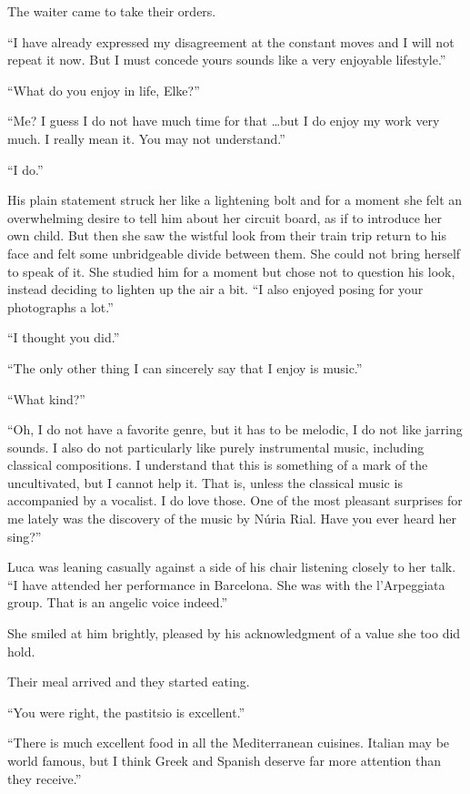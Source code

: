 The waiter came to take their orders.

``I have already expressed my disagreement at the constant moves and I will not repeat it now. But I must concede yours sounds like a very enjoyable lifestyle.''

``What do you enjoy in life, Elke?''

``Me? I guess I do not have much time for that \ldots but I do enjoy my work very much. I really mean it. You may not understand.''

``I do.''

His plain statement struck her like a lightening bolt and for a moment she felt an overwhelming desire to tell him about her circuit board, as if to introduce her own child. But then she saw the wistful look from their train trip return to his face and felt some unbridgeable divide between them. She could not bring herself to speak of it. She studied him for a moment but chose not to question his look, instead deciding to lighten up the air a bit. ``I also enjoyed posing for your photographs a lot.''

``I thought you did.''

``The only other thing I can sincerely say that I enjoy is music.''

``What kind?''

``Oh, I do not have a favorite genre, but it has to be melodic, I do not like jarring sounds. I also do not particularly like purely instrumental music, including classical compositions. I understand that this is something of a mark of the uncultivated, but I cannot help it. That is, unless the classical music is accompanied by a vocalist. I do love those. One of the most pleasant surprises for me lately was the discovery of the music by Núria Rial. Have you ever heard her sing?''

Luca was leaning casually against a side of his chair listening closely to her talk. ``I have attended her performance in Barcelona. She was with the l'Arpeggiata group. That is an angelic voice indeed.''

She smiled at him brightly, pleased by his acknowledgment of a value she too did hold.

Their meal arrived and they started eating.

``You were right, the pastitsio is excellent.''

``There is much excellent food in all the Mediterranean cuisines. Italian may be world famous, but I think Greek and Spanish deserve far more attention than they receive.''


